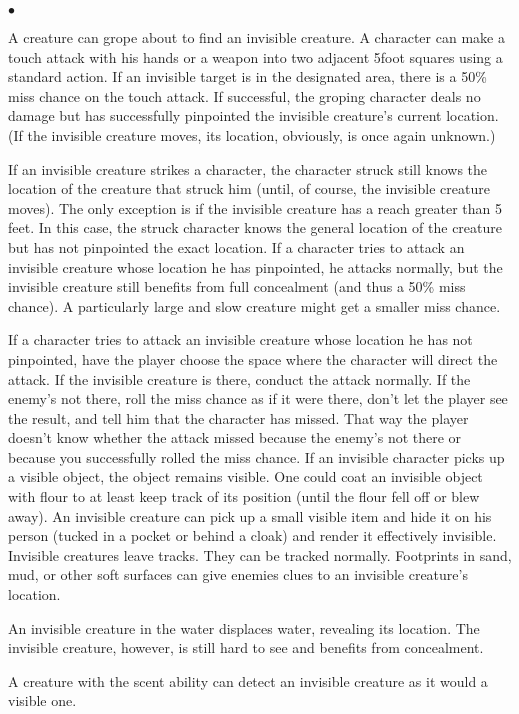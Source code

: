 \begin{list}{$\bullet$}{\itemspace}
	\item A creature can grope about to find an invisible creature. A character can make a touch attack with his hands or a weapon into two adjacent 5\textendash foot squares using a standard action. If an invisible target is in the designated area, there is a 50\% miss chance on the touch attack. If successful, the groping character deals no damage but has successfully pinpointed the invisible creature's current location. (If the invisible creature moves, its location, obviously, is once again unknown.)
	\item If an invisible creature strikes a character, the character struck still knows the location of the creature that struck him (until, of course, the invisible creature moves). The only exception is if the invisible creature has a reach greater than 5 feet. In this case, the struck character knows the general location of the creature but has not pinpointed the exact location.
If a character tries to attack an invisible creature whose location he has pinpointed, he attacks normally, but the invisible creature still benefits from full concealment (and thus a 50\% miss chance). A particularly large and slow creature might get a smaller miss chance.
	\item If a character tries to attack an invisible creature whose location he has not pinpointed, have the player choose the space where the character will direct the attack. If the invisible creature is there, conduct the attack normally. If the enemy's not there, roll the miss chance as if it were there, don't let the player see the result, and tell him that the character has missed. That way the player doesn't know whether the attack missed because the enemy's not there or because you successfully rolled the miss chance.
If an invisible character picks up a visible object, the object remains visible. One could coat an invisible object with flour to at least keep track of its position (until the flour fell off or blew away). An invisible creature can pick up a small visible item and hide it on his person (tucked in a pocket or behind a cloak) and render it effectively invisible. 
Invisible creatures leave tracks. They can be tracked normally. Footprints in sand, mud, or other soft surfaces can give enemies clues to an invisible creature's location.
	\item An invisible creature in the water displaces water, revealing its location. The invisible creature, however, is still hard to see and benefits from concealment.
	\item A creature with the scent ability can detect an invisible creature as it would a visible one.

\end{list}

